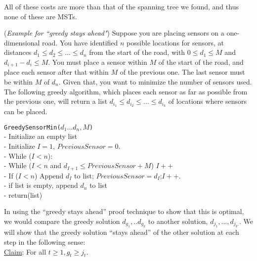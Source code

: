 \documentclass[answers]{exam}
\begin{document}
\begin{questions}
\begin{solution}
All of these costs are more than that of the spanning tree we found, and thus none of these are MSTs. 

\end{solution}

\question ({\it Example for ``greedy stays ahead"}) Suppose you are placing sensors on a one-dimensional road.  You have identified $n$ possible locations for sensors, at distances $d_1\le d_2 \le ...\le d_n$ from the start of the road, with $0 \leq d_1 \le M$ and $d_{i+1}-d_i \le M$.   You must place a sensor within $M$ of the start of the road, and place each sensor after that within $M$ of the previous one. The last sensor must be within $M$ of $d_n$.  Given that, you want to minimize the number of sensors used.  The following greedy algorithm, which places each sensor as far as possible from the previous one, will return a list $d_{i_1} \le d_{i_2} \le ... \le d_{i_k}$ of locations where sensors can be placed.  

\begin{framed}
{\tt GreedySensorMin($d_1...d_n, M$)}\\
\hspace*{0.1in} - Initialize an empty list\\
\hspace*{0.1in} - Initialize $I=1$, $PreviousSensor=0$.\\
\hspace*{0.1in} - While ($I < n$):\\
\hspace*{0.4in} - While ($I < n$ and $d_{I+1} \le PreviousSensor+ M$) $I++$\\
\hspace*{0.4in} - If ($I< n$) Append $d_I$ to list; $PreviousSensor=d_I$;$I++$. \\
\hspace*{0.1in} - if list is empty, append $d_n$ to list\\
\hspace*{0.1in} - return(list)
\end{framed}

In using the ``greedy stays ahead'' proof technique to show that
this is optimal, we would compare the greedy solution $d_{g_1},..d_{g_k}$ to another solution, $d_{j_1},..., d_{j_{k'}}$.
We will show that the greedy solution ``stays ahead'' of the other solution at each step in the following sense:\\
\underline{Claim}: For all $t \geq 1, g_t \geq j_t$.

\begin{parts}

\end{parts}
\end{questions}
\end{document}
